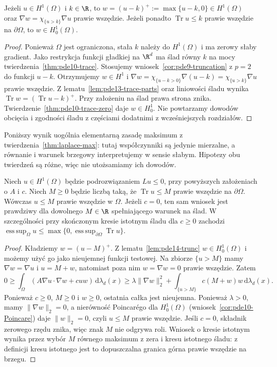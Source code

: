 \begin{lemat}
\label{lem:pde14-trunc}
Jeżeli $u\in H^1(\Omega)$ i $k\in\R$, to
$w=(u-k)^+:=\max\{u-k,0\}\in H^1(\Omega)$ oraz
$\nabla w=\chi_{\{u>k\}}\nabla u$ prawie wszędzie.
Jeżeli ponadto $\operatorname{Tr}u\le k$ prawie wszędzie na
$\partial\Omega$, to $w\in H_0^1(\Omega)$.
\end{lemat}
\begin{proof}
Ponieważ $\Omega$ jest ograniczona, stała $k$ należy do
$H^1(\Omega)$ i ma zerowy słaby gradient.
Jako restrykcja funkcji gładkiej na $\R^d$ ma ślad równy
$k$ na mocy twierdzenia~\ref{thm:pde10-trace}.
Stosujemy wniosek~\ref{cor:pde9-truncation} z $p=2$
do funkcji $u-k$. Otrzymujemy $w\in H^1$ i
$\nabla w=\chi_{\{u-k>0\}}\nabla(u-k)=\chi_{\{u>k\}}\nabla u$
prawie wszędzie.
Z lematu~\ref{lem:pde13-trace-parts} oraz liniowości śladu
wynika $\operatorname{Tr}w=(\operatorname{Tr}u-k)^+$.
Przy założeniu na ślad prawa strona znika.
Twierdzenie~\ref{thm:pde10-trace-zero} daje $w\in H_0^1$.
Nie powtarzamy dowodów obcięcia i zgodności śladu z częściami
dodatnimi z wcześniejszych rozdziałów.
\end{proof}

Poniższy wynik uogólnia elementarną zasadę maksimum
z twierdzenia~\ref{thm:laplace-max}: tutaj współczynniki
są jedynie mierzalne, a równanie i warunek brzegowy
interpretujemy w sensie słabym. Hipotezy obu twierdzeń
są różne, więc nie utożsamiamy ich dowodów.

\begin{twierdzenie}
\label{thm:pde14-weak-max}
Niech $u\in H^1(\Omega)$ będzie podrozwiązaniem $Lu\le0$,
przy powyższych założeniach o $A$ i $c$. Niech $M\ge0$ będzie
liczbą taką, że $\operatorname{Tr}u\le M$ prawie wszędzie na
$\partial\Omega$. Wówczas $u\le M$ prawie wszędzie w $\Omega$.
Jeżeli $c=0$, ten sam wniosek jest prawdziwy dla dowolnego
$M\in\R$ spełniającego warunek na ślad.
W szczególności przy skończonym kresie istotnym śladu
dla $c\ge0$ zachodzi
$\operatorname*{ess\,sup}_\Omega u
\le\max\{0,\operatorname*{ess\,sup}_{\partial\Omega}\operatorname{Tr}u\}$.
\end{twierdzenie}
\begin{proof}
Kładziemy $w=(u-M)^+$. Z lematu~\ref{lem:pde14-trunc}
$w\in H_0^1(\Omega)$ i możemy użyć go jako nieujemnej
funkcji testowej. Na zbiorze $\{u>M\}$ mamy
$\nabla w=\nabla u$ i $u=M+w$, natomiast poza nim
$w=\nabla w=0$ prawie wszędzie. Zatem
\[
 0\ge \int_\Omega(A\nabla u\cdot\nabla w+cuw)\,
 \mathrm d\lambda_d(x)
 \ge \lambda\|\nabla w\|_2^2
      +\int_{\{u>M\}}c(M+w)w\,\mathrm d\lambda_d(x).
\]
Ponieważ $c\ge0$, $M\ge0$ i $w\ge0$, ostatnia całka jest
nieujemna. Ponieważ $\lambda>0$, mamy $\|\nabla w\|_2=0$,
a nierówność Poincarégo dla $H_0^1(\Omega)$
(wniosek~\ref{cor:pde10-Poincare}) daje $\|w\|_2=0$,
czyli $u\le M$ prawie wszędzie. Jeśli $c=0$, składnik
zerowego rzędu znika, więc znak $M$ nie odgrywa roli.
Wniosek o kresie istotnym wynika przez wybór $M$ równego
maksimum z zera i kresu istotnego śladu: z definicji
kresu istotnego jest to dopuszczalna granica górna
prawie wszędzie na brzegu.
\end{proof}

